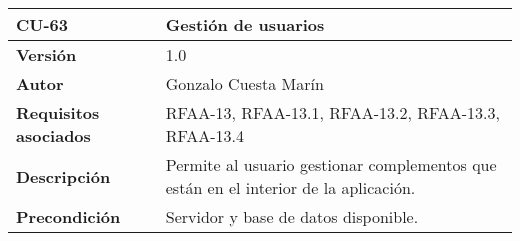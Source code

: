 \begin{longtable}[]{@{}ll@{}}
\toprule
\begin{minipage}[b]{0.21\columnwidth}\raggedright
\textbf{CU-63}\strut
\end{minipage} & \begin{minipage}[b]{0.73\columnwidth}\raggedright
\textbf{Gestión de usuarios}\strut
\end{minipage}\tabularnewline
\midrule
\endhead
\begin{minipage}[t]{0.21\columnwidth}\raggedright
\textbf{Versión}\strut
\end{minipage} & \begin{minipage}[t]{0.73\columnwidth}\raggedright
1.0\strut
\end{minipage}\tabularnewline
\begin{minipage}[t]{0.21\columnwidth}\raggedright
\textbf{Autor}\strut
\end{minipage} & \begin{minipage}[t]{0.73\columnwidth}\raggedright
Gonzalo Cuesta Marín\strut
\end{minipage}\tabularnewline
\begin{minipage}[t]{0.21\columnwidth}\raggedright
\textbf{Requisitos asociados}\strut
\end{minipage} & \begin{minipage}[t]{0.73\columnwidth}\raggedright
RFAA-13, RFAA-13.1, RFAA-13.2, RFAA-13.3, RFAA-13.4\strut
\end{minipage}\tabularnewline
\begin{minipage}[t]{0.21\columnwidth}\raggedright
\textbf{Descripción}\strut
\end{minipage} & \begin{minipage}[t]{0.73\columnwidth}\raggedright
Permite al usuario gestionar complementos que están en el interior de la
aplicación.\strut
\end{minipage}\tabularnewline
\begin{minipage}[t]{0.21\columnwidth}\raggedright
\textbf{Precondición}\strut
\end{minipage} & \begin{minipage}[t]{0.73\columnwidth}\raggedright
Servidor y base de datos disponible.


\end{minipage}
\end{longtable}
